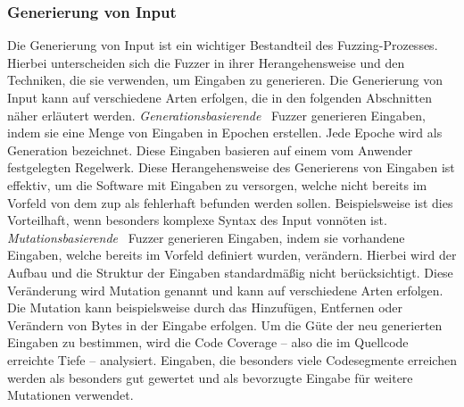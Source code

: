 \subsubsection{Generierung von Input}\label{subsubsec:generierung-von-input}
Die Generierung von Input ist ein wichtiger Bestandteil des Fuzzing-Prozesses.
Hierbei unterscheiden sich die Fuzzer in ihrer Herangehensweise und den Techniken, die sie verwenden, um Eingaben zu generieren.
Die Generierung von Input kann auf verschiedene Arten erfolgen, die in den folgenden Abschnitten näher erläutert werden.\newline\newline
\textit{Generationsbasierende}~\cite{iot-fuzzing} Fuzzer generieren Eingaben, indem sie eine Menge von Eingaben in Epochen erstellen.
Jede Epoche wird als Generation bezeichnet.
Diese Eingaben basieren auf einem vom Anwender festgelegten Regelwerk.
Diese Herangehensweise des Generierens von Eingaben ist effektiv, um die Software mit Eingaben zu versorgen, welche nicht
bereits im Vorfeld von dem \gls{zup} als fehlerhaft befunden werden sollen.
Beispielsweise ist dies Vorteilhaft, wenn besonders komplexe Syntax des Input vonnöten ist.\newline\newline
\textit{Mutationsbasierende}~\cite{iot-fuzzing} Fuzzer generieren Eingaben, indem sie vorhandene Eingaben, welche bereits im Vorfeld definiert wurden, verändern.
Hierbei wird der Aufbau und die Struktur der Eingaben standardmäßig nicht berücksichtigt.
Diese Veränderung wird Mutation genannt und kann auf verschiedene Arten erfolgen.
Die Mutation kann beispielsweise durch das Hinzufügen, Entfernen oder Verändern von Bytes in der Eingabe erfolgen.
Um die Güte der neu generierten Eingaben zu bestimmen, wird die Code Coverage -- also die im Quellcode erreichte Tiefe --
analysiert.
Eingaben, die besonders viele Codesegmente erreichen werden als besonders gut gewertet und als bevorzugte Eingabe für
weitere Mutationen verwendet.
